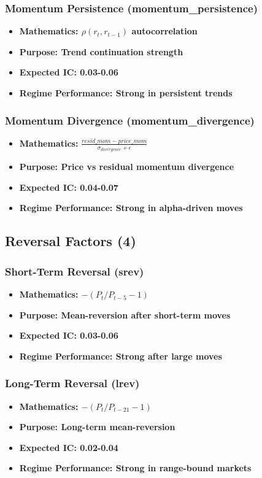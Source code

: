 \documentclass[11pt,letterpaper,openany]{book}
\begin{document}
\subsubsection{Momentum Persistence (momentum\_persistence)}
\begin{itemize}
    \item \textbf{Mathematics: $\rho(r_t, r_{t-1})$ autocorrelation}
    \item \textbf{Purpose: Trend continuation strength}
    \item \textbf{Expected IC: 0.03-0.06}
    \item \textbf{Regime Performance: Strong in persistent trends}
\end{itemize}

\subsubsection{Momentum Divergence (momentum\_divergence)}
\begin{itemize}
    \item \textbf{Mathematics:} $\frac{resid\_mom - price\_mom}{\sigma_{divergence} + \epsilon}$
    \item \textbf{Purpose: Price vs residual momentum divergence}
    \item \textbf{Expected IC: 0.04-0.07}
    \item \textbf{Regime Performance: Strong in alpha-driven moves}
\end{itemize}

\subsection{Reversal Factors (4)}

\subsubsection{Short-Term Reversal (srev)}
\begin{itemize}
    \item \textbf{Mathematics: $-(P_t / P_{t-5} - 1)$}
    \item \textbf{Purpose: Mean-reversion after short-term moves}
    \item \textbf{Expected IC: 0.03-0.06}
    \item \textbf{Regime Performance: Strong after large moves}
\end{itemize}

\subsubsection{Long-Term Reversal (lrev)}
\begin{itemize}
    \item \textbf{Mathematics: $-(P_t / P_{t-21} - 1)$}
    \item \textbf{Purpose: Long-term mean-reversion}
    \item \textbf{Expected IC: 0.02-0.04}
    \item \textbf{Regime Performance: Strong in range-bound markets}
\end{itemize}
\end{document}

